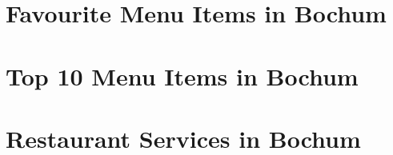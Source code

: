 \begin{appendices}
\section{Favourite Menu Items in Bochum}
\label{app:fav_items}

\section{Top 10 Menu Items in Bochum}
\label{app:items}

\section{Restaurant Services in Bochum}
\label{app:services}

\end{appendices}
